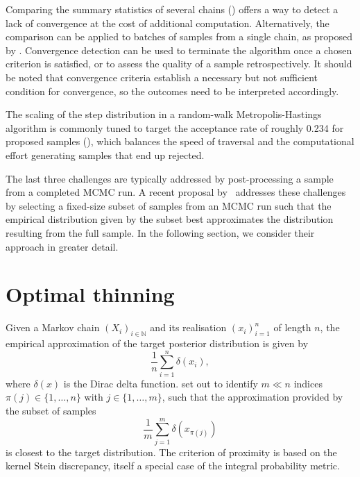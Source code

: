 \documentclass[11pt,a4paper]{report}
\begin{document}
Comparing the summary statistics of several chains (\cite{gelmanInferenceIterativeSimulation1992,brooksGeneralMethodsMonitoring1998,vehtariRankNormalizationFoldingLocalization2021}) offers a way to detect a lack of convergence at the cost of additional computation. Alternatively, the comparison can be applied to batches of samples from a single chain, as proposed by \cite{vatsRevisitingGelmanRubin2021}. Convergence detection can be used to terminate the algorithm once a chosen criterion is satisfied, or to assess the quality of a sample retrospectively. It should be noted that convergence criteria establish a necessary but not sufficient condition for convergence, so the outcomes need to be interpreted accordingly.

The scaling of the step distribution in a random-walk Metropolis-Hastings algorithm is commonly tuned to target the acceptance rate of roughly 0.234 for proposed samples (\cite{gelmanEfficientMetropolisJumping1996,gelmanWeakConvergenceOptimal1997,robertsOptimalScalingVarious2001}), which balances the speed of traversal and the computational effort generating samples that end up rejected.

The last three challenges are typically addressed by post-processing a sample from a completed MCMC run. A recent proposal by~\cite{riabizOptimalThinningMCMC2022} addresses these challenges by selecting a fixed-size subset of samples from an MCMC run such that the empirical distribution given by the subset best approximates the distribution resulting from the full sample. In the following section, we consider their approach in greater detail.


\section{Optimal thinning}

Given a Markov chain $(X_i)_{i \in \mathbb{N}}$ and its realisation $(x_i)_{i=1}^n$ of length $n$, the empirical approximation of the target posterior distribution is given by
\begin{equation}
\frac{1}{n} \sum_{i=1}^n \delta(x_i),
\label{eq:discrete-distribution}
\end{equation}
where $\delta(x)$ is the Dirac delta function.
\cite{riabizOptimalThinningMCMC2022} set out to identify $m \ll n$ indices $\pi(j) \in \{1,\dots, n\}$ with $j\in\{1, \dots, m\}$, such that the approximation provided by the subset of samples
\begin{equation}
\frac{1}{m} \sum_{j=1}^m \delta(x_{\pi(j)})
\label{eq:thinned-sample}
\end{equation}
is closest to the target distribution. The criterion of proximity is based on the kernel Stein discrepancy, itself a special case of the integral probability metric.
\end{document}
